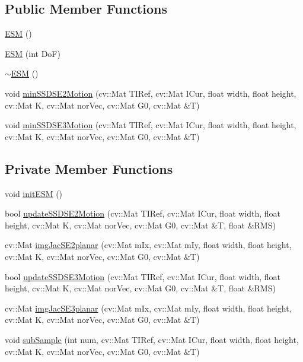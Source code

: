 \subsection*{\-Public \-Member \-Functions}
\begin{DoxyCompactItemize}
\item 
\hyperlink{classESM_a8102e5612d0e4324afb6ad7a1f49b521}{\-E\-S\-M} ()
\item 
\hyperlink{classESM_a669902e5ba5fcb868d267016459fbd3f}{\-E\-S\-M} (int \-Do\-F)
\item 
\hyperlink{classESM_ae4471a84b6b1ef423ad2f477565086ad}{$\sim$\-E\-S\-M} ()
\item 
void \hyperlink{classESM_a25a1baab1b965685f1cab290972704eb}{min\-S\-S\-D\-S\-E2\-Motion} (cv\-::\-Mat \-T\-I\-Ref, cv\-::\-Mat \-I\-Cur, float width, float height, cv\-::\-Mat \-K, cv\-::\-Mat nor\-Vec, cv\-::\-Mat \-G0, cv\-::\-Mat \&\-T)
\item 
void \hyperlink{classESM_a7b9b9c3d1af56fff9cedfff99c5e5935}{min\-S\-S\-D\-S\-E3\-Motion} (cv\-::\-Mat \-T\-I\-Ref, cv\-::\-Mat \-I\-Cur, float width, float height, cv\-::\-Mat \-K, cv\-::\-Mat nor\-Vec, cv\-::\-Mat \-G0, cv\-::\-Mat \&\-T)
\end{DoxyCompactItemize}
\subsection*{\-Private \-Member \-Functions}
\begin{DoxyCompactItemize}
\item 
void \hyperlink{classESM_ad324361009c40120380469ef3550906b}{init\-E\-S\-M} ()
\item 
bool \hyperlink{classESM_a9255571df45b2e9a9da9acccbd06f215}{update\-S\-S\-D\-S\-E2\-Motion} (cv\-::\-Mat \-T\-I\-Ref, cv\-::\-Mat \-I\-Cur, float width, float height, cv\-::\-Mat \-K, cv\-::\-Mat nor\-Vec, cv\-::\-Mat \-G0, cv\-::\-Mat \&\-T, float \&\-R\-M\-S)
\item 
cv\-::\-Mat \hyperlink{classESM_ab3f22a0e1f5fb746bac8f8cc13d557a8}{img\-Jac\-S\-E2planar} (cv\-::\-Mat m\-Ix, cv\-::\-Mat m\-Iy, float width, float height, cv\-::\-Mat \-K, cv\-::\-Mat nor\-Vec, cv\-::\-Mat \-G0, cv\-::\-Mat \&\-T)
\item 
bool \hyperlink{classESM_a33e8bbd28952f91e13ebdf33bda0e7f9}{update\-S\-S\-D\-S\-E3\-Motion} (cv\-::\-Mat \-T\-I\-Ref, cv\-::\-Mat \-I\-Cur, float width, float height, cv\-::\-Mat \-K, cv\-::\-Mat nor\-Vec, cv\-::\-Mat \-G0, cv\-::\-Mat \&\-T, float \&\-R\-M\-S)
\item 
cv\-::\-Mat \hyperlink{classESM_a75707ed83ac288a4372f9928b360075a}{img\-Jac\-S\-E3planar} (cv\-::\-Mat m\-Ix, cv\-::\-Mat m\-Iy, float width, float height, cv\-::\-Mat \-K, cv\-::\-Mat nor\-Vec, cv\-::\-Mat \-G0, cv\-::\-Mat \&\-T)
\item 
void \hyperlink{classESM_a5689903e99518705af0f6ad839f3b390}{sub\-Sample} (int num, cv\-::\-Mat \-T\-I\-Ref, cv\-::\-Mat \-I\-Cur, float width, float height, cv\-::\-Mat \-K, cv\-::\-Mat nor\-Vec, cv\-::\-Mat \-G0, cv\-::\-Mat \&\-T)
\end{DoxyCompactItemize}
